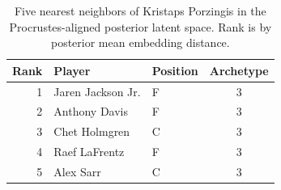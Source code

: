 \begin{table}[htbp]
  \centering\small
  \begin{tabular}{rllc}
    \toprule
    Rank & Player & Position & Archetype \\
    \midrule
    1 & Jaren Jackson Jr. & F & 3 \\
    2 & Anthony Davis & F & 3 \\
    3 & Chet Holmgren & C & 3 \\
    4 & Raef LaFrentz & F & 3 \\
    5 & Alex Sarr & C & 3 \\
    \bottomrule
  \end{tabular}
  \caption{Five nearest neighbors of Kristaps Porzingis in the Procrustes-aligned posterior latent space. Rank is by posterior mean embedding distance.}
  \label{tab:Kristaps_Porzingis_neighbors}
\end{table}

